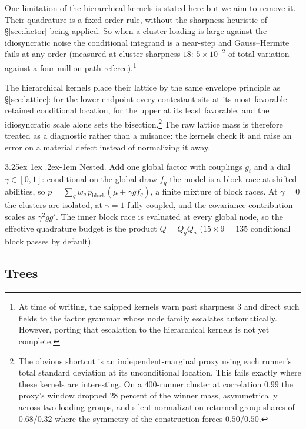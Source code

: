 \documentclass[11pt]{article}
\makeatletter
\renewcommand\paragraph{\@startsection{paragraph}{4}{\z@}%
  {3.25ex \@plus1ex \@minus.2ex}{-1em}%
  {\normalfont\normalsize\itshape}}
\makeatother
\begin{document}
One limitation of the hierarchical kernels is stated here but we aim to remove it.
Their quadrature is a fixed-order rule, without
the sharpness heuristic of \S\ref{sec:factor} being applied. So when a cluster loading
is large against the idiosyncratic noise the conditional integrand is a
near-step and Gauss--Hermite fails at any order (measured at cluster
sharpness $18$: $5\times10^{-2}$ of total variation against a
four-million-path referee).\footnote{At time of writing, the shipped kernels warn past sharpness $3$ and
direct such fields to the factor grammar whose node family escalates
automatically. However, porting that escalation to the hierarchical kernels is not yet complete.}

The hierarchical kernels place their lattice by the same envelope
principle as \S\ref{sec:lattice}: for the lower endpoint every
contestant sits at its most favorable retained conditional location,
for the upper at its least favorable, and the idiosyncratic scale
alone sets the bisection.\footnote{The obvious shortcut is an
independent-marginal proxy using each runner's total standard deviation
at its unconditional location. This fails exactly where these kernels are
interesting. On a $400$-runner cluster at correlation $0.99$ the
proxy's window dropped $28$ percent of the winner mass, asymmetrically
across two loading groups, and silent normalization returned group
shares of $0.68/0.32$ where the symmetry of the construction forces
$0.50/0.50$.} The raw lattice mass is therefore treated as a diagnostic
rather than a nuisance: the kernels check it and raise an error on a
material defect instead of normalizing it away.

\paragraph{Nested.} Add one global factor with couplings $g_i$ and a dial
$\gamma\in[0,1]$: conditional on the global draw $f_q$ the model is a block race
at shifted abilities, so
$p=\sum_q w_q\,p_{\mathrm{block}}(\mu+\gamma g f_q)$, a finite mixture of block
races. At $\gamma=0$ the clusters are isolated, at $\gamma=1$ fully
coupled, and the covariance contribution scales as $\gamma^{2}gg'$. The
inner block race is evaluated at every global node, so the effective
quadrature budget is the product $Q=Q_gQ_a$ ($15\times9=135$ conditional
block passes by default).

\subsection{Trees}\label{sec:tree}
\end{document}
